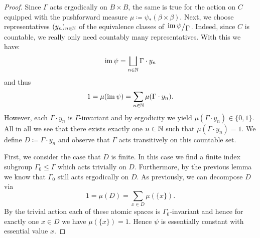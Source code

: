 \begin{proof}
  Since \(\Gamma\) acts ergodically on \(B \times B\), the same is true for the action on \(C\) equipped with the pushforward measure \(\mu \coloneqq \psi_\ast(\beta \times \beta)\). Next, we choose representatives \((y_n)_{n \in \mathbb{N}}\) of the equivalence classes of \(\quot{\im \psi}{\Gamma}\). Indeed, since \(C\) is countable, we really only need countably many representatives. With this we have:
  \[
    \operatorname{im} \psi = \bigsqcup_{n \in \mathbb{N}} \Gamma \cdot y_n
  \]
  and thus
  \[
    1 = \mu(\operatorname{im} \psi) = \sum_{n \in \mathbb{N}} \mu(\Gamma \cdot y_n).
  \]
  However, each \(\Gamma \cdot y_n\) is \(\Gamma\)-invariant and by ergodicity we yield \(\mu(\Gamma \cdot y_n) \in \{0,1\}\). All in all we see that there exists exactly one \(n \in \mathbb{N}\) such that \(\mu(\Gamma \cdot y_n) = 1\). We define \(D \coloneqq \Gamma \cdot y_n\) and observe that \(\Gamma\) acts transitively on this countable set.

  First, we consider the case that \(D\) is finite. In this case we find a finite index subgroup \(\Gamma_0 \leq \Gamma\) which acts trivially on \(D\). Furthermore, by the previous lemma we know that \(\Gamma_0\) still acts ergodically on \(D\). As previously, we can decompose \(D\) via
  \[
    1 = \mu(D) = \sum_{x \in D} \mu(\{x\}).
  \]
  By the trivial action each of these atomic spaces is \(\Gamma_0\)-invariant and hence for exactly one \(x \in D\) we have \(\mu(\{x\}) = 1\). Hence \(\psi\) is essentially constant with essential value \(x\).


\end{proof}
